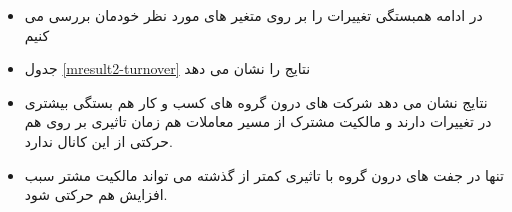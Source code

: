 \documentclass[12pt, a4paper]{article}
\begin{document}
\begin{itemize}
	\item 
	در ادامه همبستگی تغییرات 
	را بر روی متغیر های مورد نظر خودمان بررسی می کنیم
	\item 
	جدول
	\ref{mresult2-turnover}
	نتایج را نشان می دهد
	\begin{LTR}
	\end{LTR}
	\item 
	نتایج نشان می دهد شرکت های درون گروه های کسب و کار هم بستگی بیشتری در تغییرات
	دارند و مالکیت مشترک از مسیر معاملات هم زمان تاثیری بر روی هم حرکتی از این کانال ندارد.
	\item
	تنها در جفت های درون گروه با تاثیری کمتر از گذشته می تواند مالکیت مشتر سبب افزایش هم حرکتی شود.
	
\end{itemize}





\FloatBarrier


 \subsubsection{}
\end{document}
